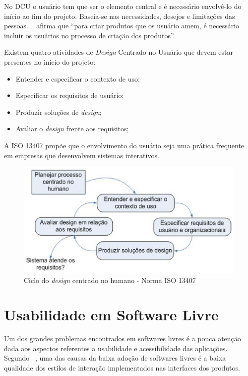 No DCU o usuário tem que ser o elemento central e é necessário envolvê-lo do início ao fim do projeto. Baseia-se nas necessidades, desejos e limitações das pessoas. ~ afirma que ``para criar produtos que os usuário amem, é necessário incluir os usuários no processo de criação dos produtos''. 


Existem quatro atividades de \emph{Design} Centrado no Usuário que devem estar presentes no inicío do projeto:

\begin{itemize}
\item Entender e especificar o contexto de uso;
\item Especificar os requisitos de usuário;
\item Produzir soluções de \emph{design};
\item Avaliar o \emph{design} frente aos requisitos;
\end{itemize}

A ISO 13407 propõe que o envolvimento do usuário seja uma prática frequente em empresas que desenvolvem sistemas interativos.

\begin{figure}[h]
    \centering
    \includegraphics[keepaspectratio=true,scale=0.60]
      {figuras/ciclo_iso13407.eps}
    \caption{Ciclo do \emph{design} centrado no humano - Norma ISO 13407}
    \label{ciclo_iso13407}
\end{figure}


\section{Usabilidade em Software Livre}

Um dos grandes problemas encontrados em softwares livres é a pouca atenção dada aos aspectos referentes a usabilidade e acessibilidade das aplicações. 
%
Segundo ~, uma das causas da baixa adoção de softwares livres é a baixa qualidade dos estilos de interação implementados nas interfaces dos produtos. 

